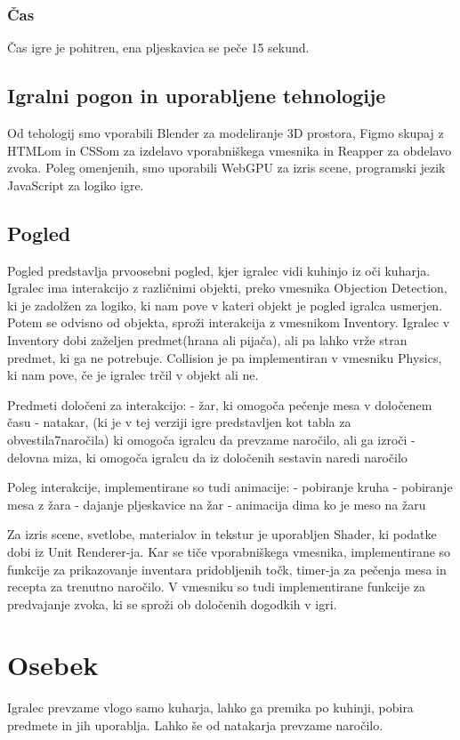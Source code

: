 \documentclass[a4paper]{article}
\begin{document}
\subsubsection{Čas}
Čas igre je pohitren, ena pljeskavica se peče 15 sekund.

\subsection{Igralni pogon in uporabljene tehnologije}
Od tehologij smo vporabili Blender za modeliranje 3D prostora, Figmo skupaj z HTMLom in CSSom za izdelavo vporabniškega vmesnika in Reapper za obdelavo zvoka.
Poleg omenjenih, smo uporabili WebGPU za izris scene, programski jezik JavaScript za logiko igre.

\subsection{Pogled}
Pogled predstavlja prvoosebni pogled, kjer igralec vidi kuhinjo iz oči kuharja. Igralec ima interakcijo z različnimi objekti, preko vmesnika Objection Detection, ki je zadolžen za logiko, ki nam pove v kateri objekt je pogled igralca usmerjen.
Potem se odvisno od objekta, sproži interakcija z vmesnikom Inventory. Igralec v Inventory dobi zaželjen predmet(hrana ali pijača), ali pa lahko vrže stran predmet, ki ga ne potrebuje.
Collision je pa implementiran v vmesniku Physics, ki nam pove, če je igralec trčil v objekt ali ne.

Predmeti določeni za interakcijo: 
- žar, ki omogoča pečenje mesa v določenem času
- natakar, (ki je v tej verziji igre predstavljen kot tabla za obvestila7naročila) ki omogoča igralcu da prevzame naročilo, ali ga izroči
- delovna miza, ki omogoča igralcu da iz določenih sestavin naredi naročilo

Poleg interakcije, implementirane so tudi animacije:
- pobiranje kruha
- pobiranje mesa z žara 
- dajanje pljeskavice na žar
- animacija dima ko je meso na žaru

Za izris scene, svetlobe, materialov in tekstur je uporabljen Shader, ki podatke dobi iz Unit Renderer-ja. Kar se tiče vporabniškega vmesnika, implementirane so funkcije za prikazovanje inventara pridobljenih točk,
timer-ja za pečenja mesa in recepta za trenutno naročilo. V vmesniku so tudi implementirane funkcije za predvajanje zvoka, ki se sproži ob določenih dogodkih v igri.

\section{Osebek}
Igralec prevzame vlogo samo kuharja, lahko ga premika po kuhinji, pobira predmete in jih uporablja. Lahko še od natakarja prevzame naročilo.
\end{document}
